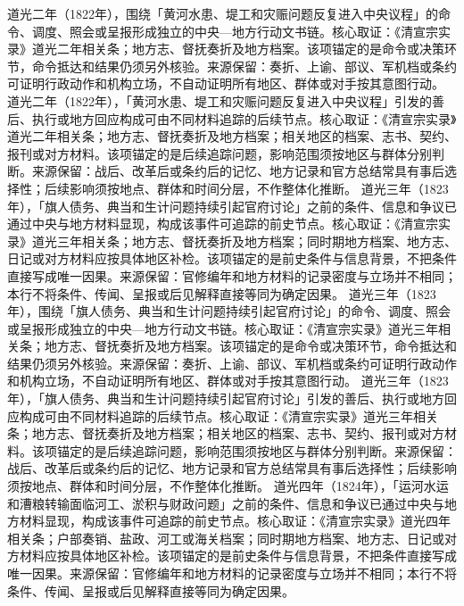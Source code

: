 道光二年（1822年），围绕「黄河水患、堤工和灾赈问题反复进入中央议程」的命令、调度、照会或呈报形成独立的中央—地方行动文书链。核心取证：《清宣宗实录》道光二年相关条；地方志、督抚奏折及地方档案。该项锚定的是命令或决策环节，命令抵达和结果仍须另外核验。来源保留：奏折、上谕、部议、军机档或条约可证明行政动作和机构立场，不自动证明所有地区、群体或对手按其意图行动。
道光二年（1822年），「黄河水患、堤工和灾赈问题反复进入中央议程」引发的善后、执行或地方回应构成可由不同材料追踪的后续节点。核心取证：《清宣宗实录》道光二年相关条；地方志、督抚奏折及地方档案；相关地区的档案、志书、契约、报刊或对方材料。该项锚定的是后续追踪问题，影响范围须按地区与群体分别判断。来源保留：战后、改革后或条约后的记忆、地方记录和官方总结常具有事后选择性；后续影响须按地点、群体和时间分层，不作整体化推断。
道光三年（1823年），「旗人债务、典当和生计问题持续引起官府讨论」之前的条件、信息和争议已通过中央与地方材料显现，构成该事件可追踪的前史节点。核心取证：《清宣宗实录》道光三年相关条；地方志、督抚奏折及地方档案；同时期地方档案、地方志、日记或对方材料应按具体地区补检。该项锚定的是前史条件与信息背景，不把条件直接写成唯一因果。来源保留：官修编年和地方材料的记录密度与立场并不相同；本行不将条件、传闻、呈报或后见解释直接等同为确定因果。
道光三年（1823年），围绕「旗人债务、典当和生计问题持续引起官府讨论」的命令、调度、照会或呈报形成独立的中央—地方行动文书链。核心取证：《清宣宗实录》道光三年相关条；地方志、督抚奏折及地方档案。该项锚定的是命令或决策环节，命令抵达和结果仍须另外核验。来源保留：奏折、上谕、部议、军机档或条约可证明行政动作和机构立场，不自动证明所有地区、群体或对手按其意图行动。
道光三年（1823年），「旗人债务、典当和生计问题持续引起官府讨论」引发的善后、执行或地方回应构成可由不同材料追踪的后续节点。核心取证：《清宣宗实录》道光三年相关条；地方志、督抚奏折及地方档案；相关地区的档案、志书、契约、报刊或对方材料。该项锚定的是后续追踪问题，影响范围须按地区与群体分别判断。来源保留：战后、改革后或条约后的记忆、地方记录和官方总结常具有事后选择性；后续影响须按地点、群体和时间分层，不作整体化推断。
道光四年（1824年），「运河水运和漕粮转输面临河工、淤积与财政问题」之前的条件、信息和争议已通过中央与地方材料显现，构成该事件可追踪的前史节点。核心取证：《清宣宗实录》道光四年相关条；户部奏销、盐政、河工或海关档案；同时期地方档案、地方志、日记或对方材料应按具体地区补检。该项锚定的是前史条件与信息背景，不把条件直接写成唯一因果。来源保留：官修编年和地方材料的记录密度与立场并不相同；本行不将条件、传闻、呈报或后见解释直接等同为确定因果。
